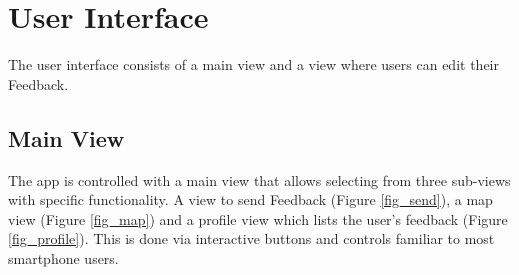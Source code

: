 \section{User Interface}
The user interface consists of a main view and a view where users can edit their Feedback.
\subsection{Main View}
The app is controlled with a main view that allows selecting from three sub-views with specific functionality. A view to send Feedback (Figure \ref{fig_send}), a map view (Figure \ref{fig_map}) and a profile view which lists the user's feedback (Figure \ref{fig_profile}). This is done via interactive buttons and controls familiar to most smartphone users.\\

